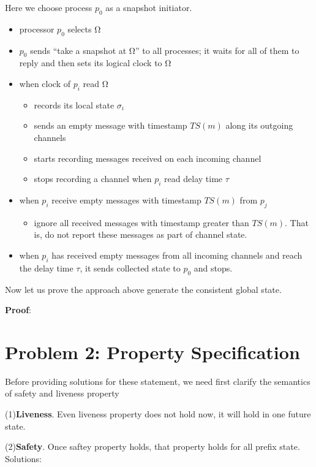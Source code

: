 \documentclass[11pt,a4paper]{article}
\begin{document}
Here we choose process $p_0$ as a snapshot initiator.
\begin{itemize}
    \item{processor $p_0$ selects Ω}
    \item{$p_0$ sends “take a snapshot at Ω” to all processes; it waits for all
            of them to reply and then sets its logical clock to Ω}
    \item{when clock of $p_i$ read Ω}
        \begin{itemize}
            \item{records its local state $\sigma_i$}
            \item{sends an empty message with timestamp $TS(m)$ along its outgoing channels}
            \item{starts recording messages received on each incoming channel}
            \item{stops recording a channel when $p_i$ read delay time $\tau$}
        \end{itemize}
    \item{when $p_i$ receive empty messages with timestamp $TS(m)$ from $p_j$}
        \begin{itemize}
            \item{ignore all received messages with timestamp greater than
                    $TS(m)$. That is, do not report these messages as part of
                    channel state.}
        \end{itemize}
    \item{when $p_i$ has received empty messages from all incoming channels
            and reach the delay time $\tau$, it sends collected state to $p_0$ and
            stops.} 
\end{itemize}

Now let us prove the approach above generate the consistent global state.

\textbf{Proof}: 

\newpage
\section{Problem 2: Property Specification}
Before providing solutions for these statement, we need first clarify the
semantics of safety and liveness property 

(1)\textbf{Liveness}. Even liveness property does not hold now, it will hold
in one future state.

(2)\textbf{Safety}. Once saftey property holds, that property holds for all
prefix state.
\\
Solutions: 
\end{document}
